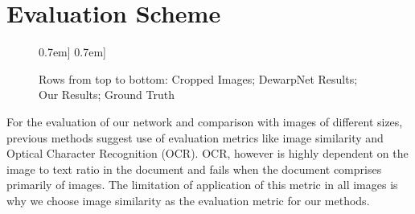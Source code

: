 \documentclass[a4paper,conference]{IEEEtran}
\begin{document}
	\section{Evaluation Scheme}
	
	\begin{figure*}
	\centering
	\hspace*{-0.5em}\hspace*{-0.5em}\hspace*{-0.5em}
	\-0.7em]
	\hspace*{-0.5em}\hspace*{-0.5em}\hspace*{-0.5em}\-0.7em]
\hspace*{-0.5em}\hspace*{-0.5em}\hspace*{-0.5em}
	\caption{Rows from top to bottom: Cropped Images; DewarpNet Results; Our Results; Ground Truth}
\end{figure*}
 	
	For the evaluation of our network and comparison with images of different sizes, previous methods suggest use of evaluation metrics like image similarity and Optical Character Recognition (OCR). OCR, however is highly dependent on the image to text ratio in the document and fails when the document comprises primarily of images. The limitation of application of this metric in all images is why we choose image similarity as the evaluation metric for our methods.
	
\end{document}
